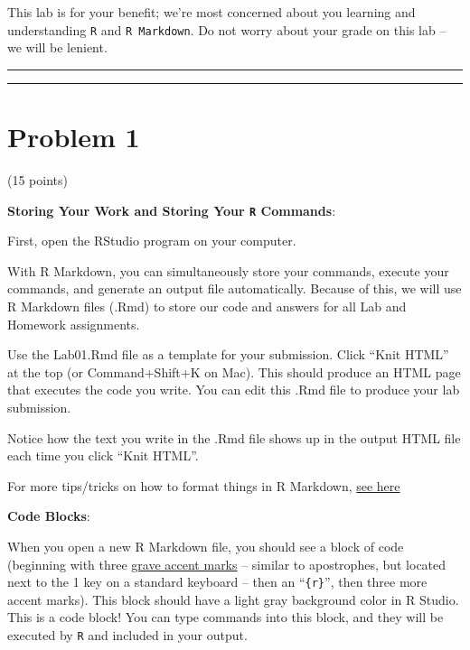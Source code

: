 \documentclass[]{article}
\begin{document}
This lab is for your benefit; we're most concerned about you learning
and understanding \texttt{R} and \texttt{R\ Markdown}. Do not worry
about your grade on this lab -- we will be lenient.

\begin{center}\rule{0.5\linewidth}{\linethickness}\end{center}

\begin{center}\rule{0.5\linewidth}{\linethickness}\end{center}

\hypertarget{problem-1}{%
\section{Problem 1}\label{problem-1}}

(15 points)

\textbf{Storing Your Work and Storing Your \texttt{R} Commands}:

First, open the RStudio program on your computer.

With R Markdown, you can simultaneously store your commands, execute
your commands, and generate an output file automatically. Because of
this, we will use R Markdown files (.Rmd) to store our code and answers
for all Lab and Homework assignments.

Use the Lab01.Rmd file as a template for your submission. Click ``Knit
HTML'' at the top (or Command+Shift+K on Mac). This should produce an
HTML page that executes the code you write. You can edit this .Rmd file
to produce your lab submission.

Notice how the text you write in the .Rmd file shows up in the output
HTML file each time you click ``Knit HTML''.

For more tips/tricks on how to format things in R Markdown,
\href{https://www.rstudio.com/wp-content/uploads/2015/02/rmarkdown-cheatsheet.pdf}{see
here}

\textbf{Code Blocks}:

When you open a new R Markdown file, you should see a block of code
(beginning with three
\href{https://en.wikipedia.org/wiki/Grave_accent}{grave accent marks} --
similar to apostrophes, but located next to the 1 key on a standard
keyboard -- then an ``\texttt{\{r\}}'', then three more accent marks).
This block should have a light gray background color in R Studio. This
is a code block! You can type commands into this block, and they will be
executed by \texttt{R} and included in your output.
\end{document}
